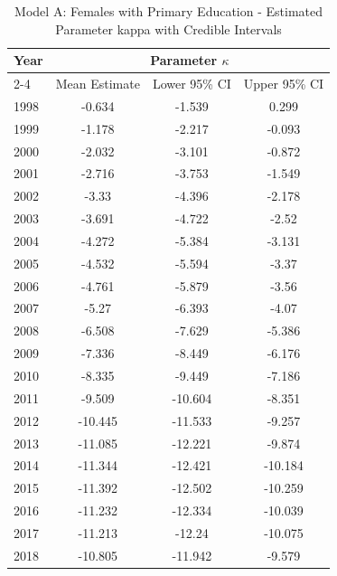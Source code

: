\begin{landscape}
\begin{table}[htbp]
\centering
\caption{Model A: Females with Primary Education - Estimated Parameter kappa with Credible Intervals}
\label{tab:parameters_k2}
\begin{tabular}{@{}lccc@{}}
\toprule
Year & \multicolumn{3}{c}{Parameter \(\kappa\)} \\
\cmidrule(lr){2-4}
      & Mean Estimate & Lower 95\% CI & Upper 95\% CI \\
\midrule
1998 & -0.634 & -1.539 & 0.299 \\
1999 & -1.178 & -2.217 & -0.093 \\
2000 & -2.032 & -3.101 & -0.872 \\
2001 & -2.716 & -3.753 & -1.549 \\
2002 & -3.33 & -4.396 & -2.178 \\
2003 & -3.691 & -4.722 & -2.52 \\
2004 & -4.272 & -5.384 & -3.131 \\
2005 & -4.532 & -5.594 & -3.37 \\
2006 & -4.761 & -5.879 & -3.56 \\
2007 & -5.27 & -6.393 & -4.07 \\
2008 & -6.508 & -7.629 & -5.386 \\
2009 & -7.336 & -8.449 & -6.176 \\
2010 & -8.335 & -9.449 & -7.186 \\
2011 & -9.509 & -10.604 & -8.351 \\
2012 & -10.445 & -11.533 & -9.257 \\
2013 & -11.085 & -12.221 & -9.874 \\
2014 & -11.344 & -12.421 & -10.184 \\
2015 & -11.392 & -12.502 & -10.259 \\
2016 & -11.232 & -12.334 & -10.039 \\
2017 & -11.213 & -12.24 & -10.075 \\
2018 & -10.805 & -11.942 & -9.579 \\
\bottomrule
\end{tabular}
\end{table}
\end{landscape}